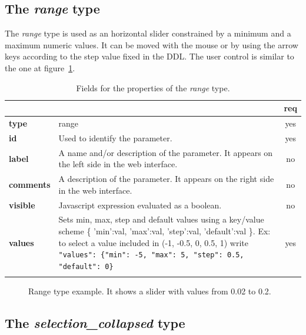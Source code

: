 \subsection{The \emph{range} type}

The \emph{range} type is used as an horizontal slider constrained by a minimum and a maximum numeric values. It can be moved with the mouse or by using the arrow keys according to the step value fixed in the DDL. The user control is similar to the one at figure~\ref{fig:sliders}.

\begin{longtable}{|>{\bf}L{\linewidth}|L{\linewidth}|c|}
\hline
      &  & {\bf req} 
\tabularnewline \hline \hline
 type   & range       & yes \\ \hline
 id     & Used to identify the parameter. & yes \\ \hline
 label  & A name and/or description of the parameter. It appears on the left side in the web interface. & no
                      \\ \hline
 comments & A description of the parameter. It appears on the right side in the web interface. & no
                      \\ \hline
 visible    & Javascript expression evaluated as a boolean. & no \\ \hline
 values & Sets min, max, step and default values using a key/value 
scheme \{ 'min':val, 'max':val, 'step':val, 'default':val \}. 
Ex: to select a value included in (-1, -0.5, 0, 0.5, 1) write \texttt{"values": \{"min": -5, "max": 5, "step": 0.5, "default": 0\}}  & yes
                      \\ \hline
\caption{Fields for the properties of the \emph{range} type.}
\end{longtable}

\begin{figure}[h]
\centering
{}
\caption{Range type example. It shows a slider with values from 0.02 to 0.2.}
\label{fig:sliders}
\end{figure}

\subsection{The \emph{selection\_collapsed} type}

